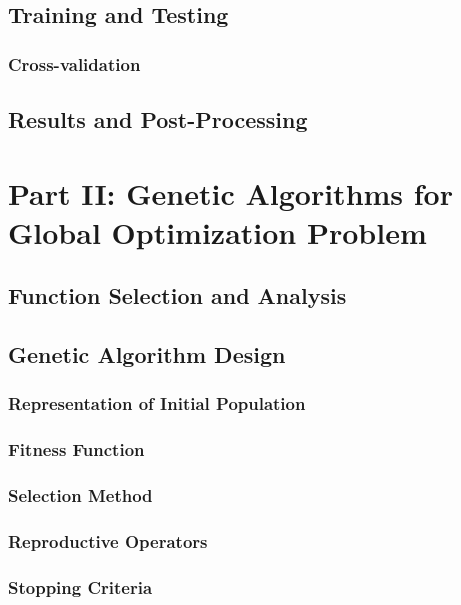 \documentclass[conference]{inc/IEEEtran}
\begin{document}
\subsection{Training and Testing}

\subsubsection{Cross-validation}

\subsection{Results and Post-Processing}

\section{Part II: Genetic Algorithms for Global Optimization Problem}

\subsection{Function Selection and Analysis}
\subsection{Genetic Algorithm Design}

\subsubsection{Representation of Initial Population}

\subsubsection{Fitness Function}

\subsubsection{Selection Method}

\subsubsection{Reproductive Operators}

\subsubsection{Stopping Criteria}
\end{document}
